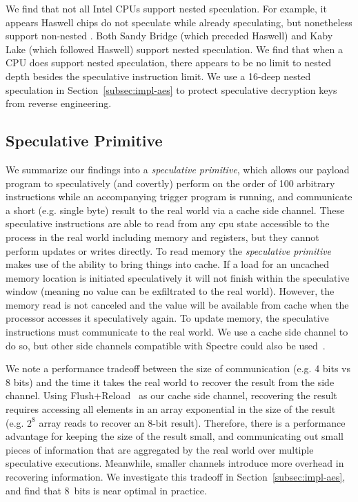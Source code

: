 We find that not all Intel CPUs support nested speculation. For
example, it appears Haswell chips do not speculate while already speculating,
but nonetheless support non-nested \speculake. Both Sandy Bridge (which
preceded Haswell) and Kaby Lake (which followed Haswell) support nested
speculation. We find that when a CPU does support nested speculation, there
appears to be no limit to nested depth besides the speculative instruction
limit. We use a 16-deep nested speculation in Section~\ref{subsec:impl-aes}
to protect speculative decryption keys from reverse
engineering.

\subsection{Speculative Primitive}

We summarize our findings into a \emph{speculative primitive}, which allows our
payload program to speculatively (and covertly) perform on the order of 100
arbitrary instructions while an accompanying trigger program is running, and
communicate a short (e.g. single byte) result to the real world via a cache side
channel. These speculative instructions are able to read from any cpu state 
accessible to the process in the real world including memory and registers, 
but they cannot perform updates 
or writes directly. To read memory the \emph{speculative primitive} makes use
of the ability to bring things into cache. If a load for an uncached memory 
location is initiated speculatively it will not finish within the speculative 
window (meaning no value can be exfiltrated to the real world). However, the 
memory read is not canceled and the value will be available from cache when 
the processor accesses it speculatively again. To update memory, the speculative 
instructions must communicate to the real world.  We use a cache side channel 
to do so, but other side channels compatible with Spectre could also 
be used~\cite{kiriansky2018speculative}.

We note a performance tradeoff between the size of communication (e.g. 4 bits vs
8 bits) and the time it takes the real world to recover the result from the side
channel. Using Flush+Reload~\cite{yarom2014flush+} as our cache side channel,
recovering the result requires accessing all elements in an array exponential in
the size of the result (e.g. $2^8$ array reads to recover an 8-bit result).
Therefore, there is a performance advantage for keeping the size of the result
small, and communicating out small pieces of information that are aggregated by
the real world over multiple speculative executions. Meanwhile, smaller channels
introduce more overhead in recovering information. We investigate this tradeoff
in Section~\ref{subsec:impl-aes}, and find that 8~bits is near optimal in
practice.

